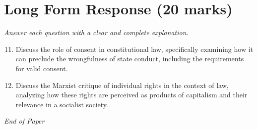 \documentclass[12pt]{article}
\begin{document}
\section*{Long Form Response (20 marks)}
\textit{Answer each question with a clear and complete explanation.}
\begin{enumerate}[label=\arabic*.]
\setcounter{enumi}{10}
\item Discuss the role of consent in constitutional law, specifically examining how it can preclude the wrongfulness of state conduct, including the requirements for valid consent.
\item Discuss the Marxist critique of individual rights in the context of law, analyzing how these rights are perceived as products of capitalism and their relevance in a socialist society.
\end{enumerate}

\vfill
\noindent\textit{End of Paper}
\end{document}
